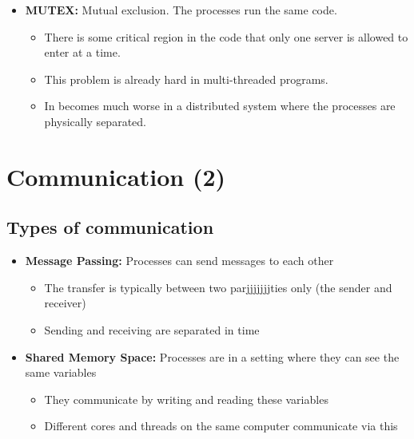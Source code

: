 \documentclass[11pt]{article}
\begin{document}
\begin{itemize}
\item \textbf{MUTEX:} Mutual exclusion. The processes run the same code.
\begin{itemize}
\item There is some critical region in the code that only one server is allowed to enter at a time.
\item This problem is already hard in multi-threaded programs.
\item In becomes much worse in a distributed system where the processes are physically separated.
\end{itemize}
\end{itemize}

\section{Communication (2)}
\label{sec:org430c2e7}
\subsection{Types of communication}
\label{sec:org6baa6d2}
\begin{itemize}
\item \textbf{Message Passing:} Processes can send messages to each other
\begin{itemize}
\item The transfer is typically between two parjjjjjjjties only (the sender and receiver)
\item Sending and receiving are separated in time
\end{itemize}

\item \textbf{Shared Memory Space:} Processes are in a setting where they can see the same variables
\begin{itemize}
\item They communicate by writing and reading these variables
\item Different cores and threads on the same computer communicate via this
\end{itemize}
\end{itemize}
\end{document}
